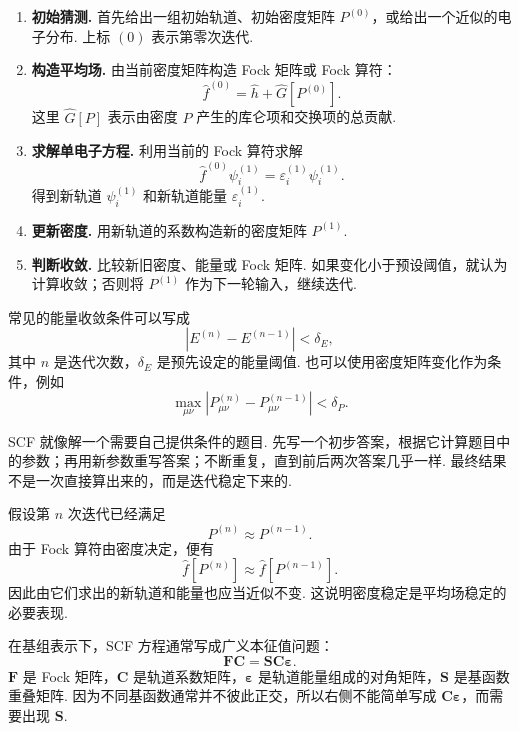 \documentclass[UTF8,11pt,a4paper,openany]{ctexbook}
\begin{document}
\begin{enumerate}
\item \textbf{初始猜测. }
首先给出一组初始轨道、初始密度矩阵 $P^{(0)}$，或给出一个近似的电子分布. 上标 $(0)$ 表示第零次迭代. 

\item \textbf{构造平均场. }
由当前密度矩阵构造 Fock 矩阵或 Fock 算符：
\[
\hat f^{(0)}
=
\hat h+\hat G[P^{(0)}].
\]
这里 $\hat G[P]$ 表示由密度 $P$ 产生的库仑项和交换项的总贡献. 

\item \textbf{求解单电子方程. }
利用当前的 Fock 算符求解
\[
\hat f^{(0)}\psi_i^{(1)}
=
\varepsilon_i^{(1)}\psi_i^{(1)}.
\]
得到新轨道 $\psi_i^{(1)}$ 和新轨道能量 $\varepsilon_i^{(1)}$. 

\item \textbf{更新密度. }
用新轨道的系数构造新的密度矩阵 $P^{(1)}$. 

\item \textbf{判断收敛. }
比较新旧密度、能量或 Fock 矩阵. 如果变化小于预设阈值，就认为计算收敛；否则将 $P^{(1)}$ 作为下一轮输入，继续迭代. 
\end{enumerate}

常见的能量收敛条件可以写成
\[
\left|E^{(n)}-E^{(n-1)}\right|<\delta_E,
\]
其中 $n$ 是迭代次数，$\delta_E$ 是预先设定的能量阈值. 也可以使用密度矩阵变化作为条件，例如
\[
\max_{\mu\nu}
\left|P_{\mu\nu}^{(n)}-P_{\mu\nu}^{(n-1)}\right|
<\delta_P.
\]

\begin{analogybox}
SCF 就像解一个需要自己提供条件的题目. 先写一个初步答案，根据它计算题目中的参数；再用新参数重写答案；不断重复，直到前后两次答案几乎一样. 最终结果不是一次直接算出来的，而是迭代稳定下来的. 
\end{analogybox}

\begin{derivationbox}
假设第 $n$ 次迭代已经满足
\[
P^{(n)}\approx P^{(n-1)}.
\]
由于 Fock 算符由密度决定，便有
\[
\hat f[P^{(n)}]\approx \hat f[P^{(n-1)}].
\]
因此由它们求出的新轨道和能量也应当近似不变. 这说明密度稳定是平均场稳定的必要表现. 
\end{derivationbox}

在基组表示下，SCF 方程通常写成广义本征值问题：
\[
\mathbf F\mathbf C
=
\mathbf S\mathbf C\boldsymbol{\varepsilon}.
\]
$\mathbf F$ 是 Fock 矩阵，$\mathbf C$ 是轨道系数矩阵，$\boldsymbol{\varepsilon}$ 是轨道能量组成的对角矩阵，$\mathbf S$ 是基函数重叠矩阵. 因为不同基函数通常并不彼此正交，所以右侧不能简单写成 $\mathbf C\boldsymbol{\varepsilon}$，而需要出现 $\mathbf S$. 
\end{document}
